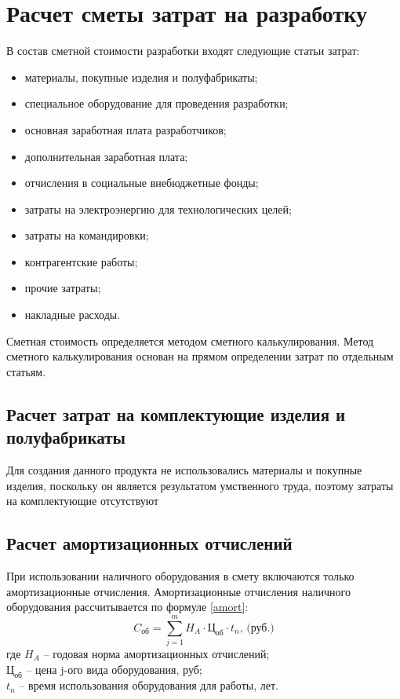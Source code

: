 \section{Расчет сметы затрат на разработку}
В состав сметной стоимости разработки входят следующие статьи затрат:
\begin{itemize}
\item материалы, покупные изделия и полуфабрикаты;
\item специальное оборудование для проведения разработки;
\item основная заработная плата разработчиков;
\item дополнительная заработная плата;
\item отчисления в социальные внебюджетные фонды;
\item затраты на электроэнергию для технологических целей;
\item затраты на командировки;
\item контрагентские работы;
\item прочие затраты;
\item накладные расходы.
\end{itemize}
Сметная стоимость определяется методом сметного калькулирования. Метод сметного калькулирования основан на прямом определении затрат по отдельным статьям.

\subsection{Расчет затрат на комплектующие изделия и полуфабрикаты}
Для создания данного продукта не использовались материалы и покупные изделия, поскольку он является результатом умственного труда, поэтому затраты на комплектующие отсутствуют
\subsection{Расчет амортизационных отчислений}
При использовании наличного оборудования в смету включаются только амортизационные отчисления. Амортизационные отчисления наличного оборудования рассчитывается по формуле \ref{amort}:
\begin{equation}
C_\textit{об} = \sum_{j=1}^m H_A \cdot \textit{Ц}_\textit{об} \cdot t_n \mbox{, (руб.)}
\label{amort}
\end{equation}
где  $H_A$ – годовая норма амортизационных отчислений;\\
$\textit{Ц}_\textit{об}$ – цена j-ого вида оборудования, руб;\\
$t_n$ – время использования оборудования для работы, лет.

